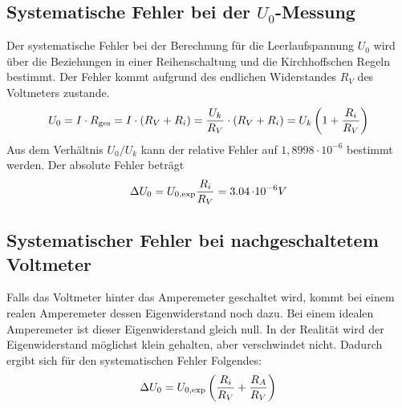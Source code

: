 \subsection{Systematische Fehler bei der $U_0$-Messung}
Der systematische Fehler bei der Berechnung für die Leerlaufspannung $U_0$ wird über die Beziehungen in einer Reihenschaltung und die Kirchhoffschen Regeln bestimmt.
Der Fehler kommt aufgrund des endlichen Widerstandes $R_V$ des Voltmeters zustande.
\begin{equation}
    U_0 = I \cdot R_\text{ges} = I \cdot (R_V + R_i) = \frac{U_k}{R_V} \cdot (R_V + R_i) = U_k \left(1+\frac{R_i}{R_V}\right)  \notag
\end{equation}
Aus dem Verhältnis $U_0/U_k$ kann der relative Fehler auf $1,8998 \cdot 10^{-6}$ bestimmt werden.
Der absolute Fehler beträgt
\begin{equation}
    \Delta U_0 = U_\text{0,exp} \frac{R_i}{R_V} = \SI{3,04}{\cdot}{10^{-6}}{V}    \notag
\end{equation}

\subsection{Systematischer Fehler bei nachgeschaltetem Voltmeter}
Falls das Voltmeter hinter das Amperemeter geschaltet wird, kommt bei einem realen Amperemeter dessen Eigenwiderstand noch dazu.
Bei einem idealen Amperemeter ist dieser Eigenwiderstand gleich null.
In der Realität wird der Eigenwiderstand möglichst klein gehalten, aber verschwindet nicht.
Dadurch ergibt sich für den systematischen Fehler Folgendes:
\begin{equation}
    \Delta U_0 = U_\text{0,exp} \left (\frac{R_i}{R_V} + \frac{R_A}{R_V} \right)  \notag
\end{equation}

